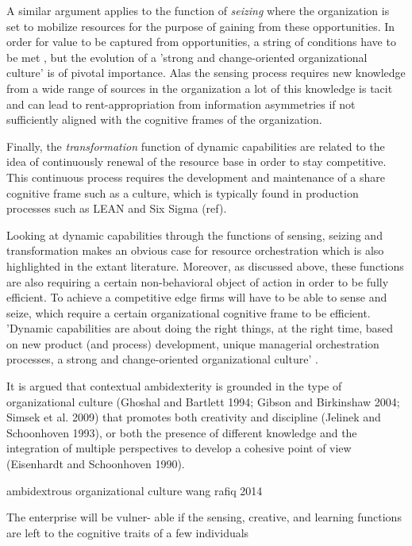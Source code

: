A similar argument applies to the function of \emph{seizing} where the organization is set
to mobilize resources for the purpose of gaining from these opportunities. In order for
value to be captured from opportunities, a string of conditions have to be met
\citep{Teece2017}, but the evolution of a 'strong and change-oriented organizational
culture' \citep[p. 331]{Teece2014} is of pivotal importance. Alas the sensing process
requires new knowledge from a wide range of sources in the organization a lot of this
knowledge is tacit and can lead to rent-appropriation from information asymmetries
\citep{Blyler2003} if not sufficiently aligned with the cognitive frames of the
organization.

Finally, the \emph{transformation} function of dynamic capabilities are related to the
idea of continuously renewal of the resource base in order to stay competitive. This continuous
process requires the development and maintenance of a share cognitive frame such as a
culture, which is typically found in production processes such as LEAN and Six Sigma
(ref).     

Looking at dynamic capabilities through the functions of sensing, seizing and
transformation makes an obvious case for resource orchestration which is also highlighted
in the extant literature. Moreover, as discussed above, these functions are also requiring
a certain non-behavioral object of action in order to be fully efficient. To achieve a
competitive edge firms will have to be able to sense and seize, which require a certain
organizational cognitive frame to be efficient. 'Dynamic capabilities are about doing the
right things, at the right time, based on new product (and process) development, unique
managerial orchestration processes, a strong and change-oriented organizational culture'
\cite[p]{Teece2014}. 


It is argued that contextual ambidexterity is grounded in the type of organizational culture (Ghoshal and Bartlett 1994; Gibson and Birkinshaw 2004; Simsek et al. 2009) that promotes both creativity and discipline (Jelinek and Schoonhoven 1993), or both the presence of different knowledge and the integration of multiple perspectives to develop a cohesive point of view (Eisenhardt and Schoonhoven 1990).

ambidextrous organizational culture wang rafiq 2014


The enterprise will be vulner- able if the sensing, creative, and learning functions are left to the cognitive traits of a few individuals


